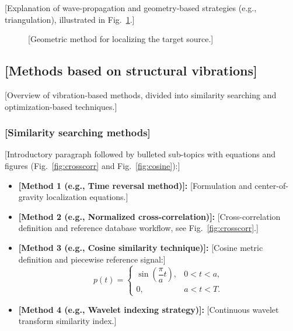 \documentclass[final,5p,times,twocolumn]{elsarticle}
\begin{document}
[Explanation of wave-propagation and geometry-based strategies (e.g., triangulation), illustrated in Fig.~\ref{fig:triangulation}.]

\begin{figure}[t]
    \centering
    \caption{[Geometric method for localizing the target source.]}
    \label{fig:triangulation}
\end{figure}

\subsection{[Methods based on structural vibrations]}\label{subsec:sec3_2}

[Overview of vibration-based methods, divided into similarity searching and optimization-based techniques.]

\subsubsection{[Similarity searching methods]}\label{subsubsec:sec3_2_1}

[Introductory paragraph followed by bulleted sub-topics with equations and figures (Fig.~\ref{fig:crosscorr} and Fig.~\ref{fig:cosine}):]

\begin{itemize}
    \item \textbf{[Method 1 (e.g., Time reversal method)]:} [Formulation and center-of-gravity localization equations.]
    \item \textbf{[Method 2 (e.g., Normalized cross-correlation)]:} [Cross-correlation definition and reference database workflow, see Fig.~\ref{fig:crosscorr}.]
    \item \textbf{[Method 3 (e.g., Cosine similarity technique)]:} [Cosine metric definition and piecewise reference signal:]
    \begin{equation}\label{eq:piecewise}
        p(t) =
        \begin{cases}
            \sin\!\left(\dfrac{\pi}{a} t\right), & 0 < t < a, \\
            0, & a < t < T.
        \end{cases}
    \end{equation}
    \item \textbf{[Method 4 (e.g., Wavelet indexing strategy)]:} [Continuous wavelet transform similarity index.]
\end{itemize}
\end{document}
